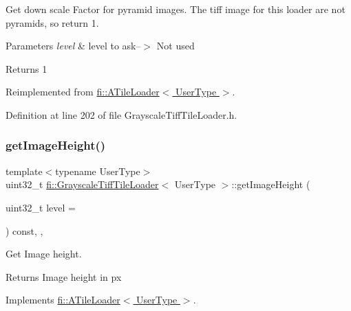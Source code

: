 Get down scale Factor for pyramid images. The tiff image for this loader are not pyramids, so return 1. 


\begin{DoxyParams}{Parameters}
{\em level} & level to ask--$>$ Not used \\
\hline
\end{DoxyParams}
\begin{DoxyReturn}{Returns}
1 
\end{DoxyReturn}


Reimplemented from \hyperlink{classfi_1_1ATileLoader_a07d565eeaa7076d905a329c80c1e980c}{fi\+::\+A\+Tile\+Loader$<$ User\+Type $>$}.



Definition at line 202 of file Grayscale\+Tiff\+Tile\+Loader.\+h.

\mbox{\label{classfi_1_1GrayscaleTiffTileLoader_aedb905b521b888c68a59d20695c33e51}} 
\subsubsection{\texorpdfstring{get\+Image\+Height()}{getImageHeight()}}
{\footnotesize\ttfamily template$<$typename User\+Type$>$ \\
uint32\+\_\+t \hyperlink{classfi_1_1GrayscaleTiffTileLoader}{fi\+::\+Grayscale\+Tiff\+Tile\+Loader}$<$ User\+Type $>$\+::get\+Image\+Height (\begin{DoxyParamCaption}\item[{uint32\+\_\+t}]{level = {} }\end{DoxyParamCaption}) const\hspace{0.3cm}{\ttfamily [inline]}, {\ttfamily [override]}, {\ttfamily [virtual]}}



Get Image height. 

\begin{DoxyReturn}{Returns}
Image height in px 
\end{DoxyReturn}


Implements \hyperlink{classfi_1_1ATileLoader_a53fb257d3ec8f3fa3d5f6c58de859000}{fi\+::\+A\+Tile\+Loader$<$ User\+Type $>$}.



